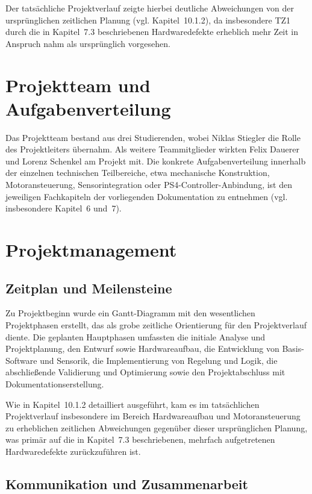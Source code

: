 \documentclass[12pt,ngerman,numbers=noenddot,abstracton,headsepline]{scrreprt}
\begin{document}
Der tatsächliche Projektverlauf zeigte hierbei deutliche Abweichungen von der ursprünglichen zeitlichen Planung (vgl. Kapitel~10.1.2), da insbesondere TZ1 durch die in Kapitel~7.3 beschriebenen Hardwaredefekte erheblich mehr Zeit in Anspruch nahm als ursprünglich vorgesehen.

\section{Projektteam und Aufgabenverteilung}
\label{sec:projektteam}

Das Projektteam bestand aus drei Studierenden, wobei Niklas Stiegler die Rolle des Projektleiters übernahm. Als weitere Teammitglieder wirkten Felix Dauerer und Lorenz Schenkel am Projekt mit. Die konkrete Aufgabenverteilung innerhalb der einzelnen technischen Teilbereiche, etwa mechanische Konstruktion, Motoransteuerung, Sensorintegration oder PS4-Controller-Anbindung, ist den jeweiligen Fachkapiteln der vorliegenden Dokumentation zu entnehmen (vgl. insbesondere Kapitel~6 und~7).

\section{Projektmanagement}
\label{sec:projektmanagement}

\subsection{Zeitplan und Meilensteine}
\label{subsec:zeitplan_meilensteine}

Zu Projektbeginn wurde ein Gantt-Diagramm mit den wesentlichen Projektphasen erstellt, das als grobe zeitliche Orientierung für den Projektverlauf diente. Die geplanten Hauptphasen umfassten die initiale Analyse und Projektplanung, den Entwurf sowie Hardwareaufbau, die Entwicklung von Basis-Software und Sensorik, die Implementierung von Regelung und Logik, die abschließende Validierung und Optimierung sowie den Projektabschluss mit Dokumentationserstellung.

Wie in Kapitel~10.1.2 detailliert ausgeführt, kam es im tatsächlichen Projektverlauf insbesondere im Bereich Hardwareaufbau und Motoransteuerung zu erheblichen zeitlichen Abweichungen gegenüber dieser ursprünglichen Planung, was primär auf die in Kapitel~7.3 beschriebenen, mehrfach aufgetretenen Hardwaredefekte zurückzuführen ist.

\subsection{Kommunikation und Zusammenarbeit}
\label{subsec:kommunikation}
\end{document}
